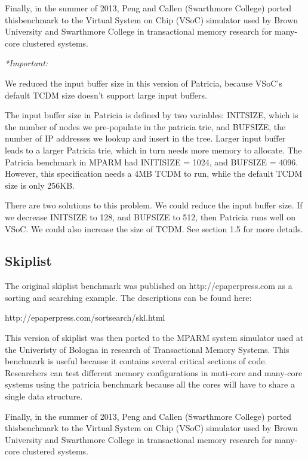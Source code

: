 \documentclass{article}
\begin{document}
Finally, in the summer of 2013, Peng and Callen (Swarthmore College) ported 
thisbenchmark to the Virtual System on Chip (VSoC) simulator used by Brown 
University and Swarthmore College in transactional memory research for 
many-core clustered systems. 

\vspace{2mm}
\emph{*Important:} 

We reduced the input buffer size in this version of Patricia, because VSoC's default TCDM size doesn't support large input buffers. 

The input buffer size in Patricia is defined by two variables: INITSIZE, which is the number of nodes we pre-populate in the patricia trie, and BUFSIZE, the number of IP addresses we lookup and insert in the tree. Larger input buffer leads to a larger Patricia trie, which in turn needs more memory to allocate. The Patricia benchmark in MPARM had INITISIZE = 1024, and BUFSIZE = 4096. However, this specification needs a 4MB TCDM to run, while the default TCDM size is only 256KB. 

There are two solutions to this problem. We could reduce the input buffer size. If we decrease INITSIZE to 128, and BUFSIZE to 512, then Patricia runs well on VSoC. We could also increase the size of TCDM. See section 1.5 for more details.

\subsection{Skiplist}

The original skiplist benchmark was published on http://epaperpress.com
as a sorting and searching example. The descriptions can be found here:

http://epaperpress.com/sortsearch/skl.html

This version of skiplist was then ported to the MPARM system simulator used at 
the Univeristy of Bologna in research of Transactional Memory Systems. This
benchmark is useful because it contains several critical sections of code. 
Researchers can test different memory configurations in muti-core and 
many-core systems using the patricia benchmark because all the cores will have 
to share a single data structure. 

Finally, in the summer of 2013, Peng and Callen (Swarthmore College) ported 
thisbenchmark to the Virtual System on Chip (VSoC) simulator used by Brown 
University and Swarthmore College in transactional memory research for 
many-core clustered systems. 
\end{document}
